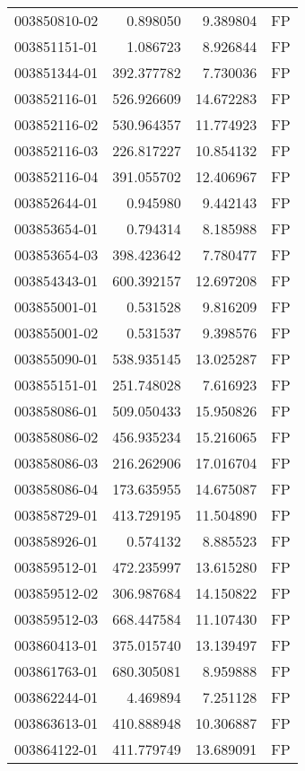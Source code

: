 \begin{tabular}{lrrl}
003850810-02 &    0.898050 &     9.389804 &   FP \\
003851151-01 &    1.086723 &     8.926844 &   FP \\
003851344-01 &  392.377782 &     7.730036 &   FP \\
003852116-01 &  526.926609 &    14.672283 &   FP \\
003852116-02 &  530.964357 &    11.774923 &   FP \\
003852116-03 &  226.817227 &    10.854132 &   FP \\
003852116-04 &  391.055702 &    12.406967 &   FP \\
003852644-01 &    0.945980 &     9.442143 &   FP \\
003853654-01 &    0.794314 &     8.185988 &   FP \\
003853654-03 &  398.423642 &     7.780477 &   FP \\
003854343-01 &  600.392157 &    12.697208 &   FP \\
003855001-01 &    0.531528 &     9.816209 &   FP \\
003855001-02 &    0.531537 &     9.398576 &   FP \\
003855090-01 &  538.935145 &    13.025287 &   FP \\
003855151-01 &  251.748028 &     7.616923 &   FP \\
003858086-01 &  509.050433 &    15.950826 &   FP \\
003858086-02 &  456.935234 &    15.216065 &   FP \\
003858086-03 &  216.262906 &    17.016704 &   FP \\
003858086-04 &  173.635955 &    14.675087 &   FP \\
003858729-01 &  413.729195 &    11.504890 &   FP \\
003858926-01 &    0.574132 &     8.885523 &   FP \\
003859512-01 &  472.235997 &    13.615280 &   FP \\
003859512-02 &  306.987684 &    14.150822 &   FP \\
003859512-03 &  668.447584 &    11.107430 &   FP \\
003860413-01 &  375.015740 &    13.139497 &   FP \\
003861763-01 &  680.305081 &     8.959888 &   FP \\
003862244-01 &    4.469894 &     7.251128 &   FP \\
003863613-01 &  410.888948 &    10.306887 &   FP \\
003864122-01 &  411.779749 &    13.689091 &   FP \\

\end{tabular}
